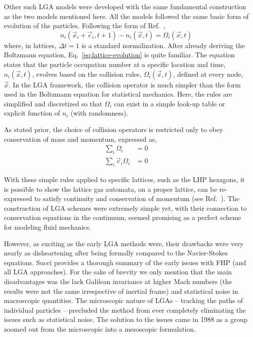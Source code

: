 Other such LGA models were developed with the same fundamental construction as the two models mentioned here. All the models followed the same basic form of evolution of the particles. Following the form of Ref.~\cite{chopard1998cellular},
\begin{equation}\label{eq:lattice-evolution}
	n_i(\vec{x}_i + \vec{c}_i,t+1) - n_i(\vec{x},t) = \Omega_i(\vec{x},t)
\end{equation}
where, in lattices, $\Delta t = 1$ is a standard normalization. After already deriving the Boltzmann equation, Eq.~\ref{eq:lattice-evolution} is quite familiar. The equation states that the particle occupation number at a specific location and time, $n_i(\vec{x},t)$, evolves based on the collision rules, $\Omega_i(\vec{x},t)$, defined at every node, $\vec{x}$. In the LGA framework, the collision operator is much simpler than the form used in the Boltzmann equation for statistical mechanics. Here, the rules are simplified and discretized so that $\Omega_i$ can exist in a simple look-up table or explicit function of $n_i$ (with randomness).\cite{chopard1998cellular,Sukop2007}

As stated prior, the choice of collision operators is restricted only to obey conservation of mass and momentum, expressed as,
\begin{subequations}
\begin{align}
	\sum_i\Omega_i &= 0\\
	\sum_i\vec{c}_i\Omega_i&=0
\end{align}
\end{subequations}

With these simple rules applied to specific lattices, such as the LHP hexagons, it is possible to show the lattice gas automata, on a proper lattice, can be re-expressed to satisfy continuity and conservation of momentum (see Ref.~\cite{Viggen2009,Frisch1986}). The construction of LGA schemes were extremely simple yet, with their connection to conservation equations in the continuum, seemed promising as a perfect scheme for modeling fluid mechanics.

However, as exciting as the early LGA methods were, their drawbacks were very nearly as disheartening after being formally compared to the Navier-Stokes equations. Succi provides a thorough summary of the early issues with FHP (and all LGA approaches).\cite{succi2001lattice} For the sake of brevity we only mention that the main disadvantages was the lack Galilean invariance at higher Mach numbers (the results were not the same irrespective of inertial frame) and statistical noise in macroscopic quantities. The microscopic nature of LGAs -- tracking the paths of individual particles -- precluded the method from ever completely eliminating the issues such as statistical noise. The solution to the issues came in 1988 as a group zoomed out from the microscopic into a mesoscopic formulation.



